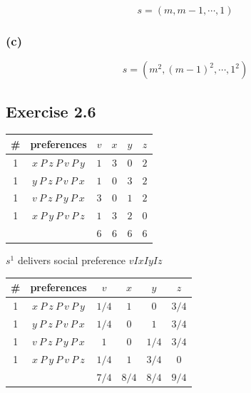 \documentclass[a4paper]{article}
\begin{document}
\[s=(m, m-1, \cdots, 1) \]

\subsubsection*{(c)}

\[s=(m^2, (m-1)^2, \cdots, 1^2) \]

\subsection*{Exercise 2.6}

\begin{table}[!htbp]
    \centering
    \begin{tabular}{c|c|cccc|}
        \# & preferences                  & $v$  & $x$  & $y$  & $z$ \\ 
        \hline
        1  & $x\: P\: z\: P\: v\: P\: y$  & $1$  & $3$  & $0$  & $2$ \\
        1  & $y\: P\: z\: P\: v\: P\: x$  & $1$  & $0$  & $3$  & $2$ \\
        1  & $v\: P\: z\: P\: y\: P\: x$  & $3$  & $0$  & $1$  & $2$ \\
        1  & $x\: P\: y\: P\: v\: P\: z$  & $1$  & $3$  & $2$  & $0$ \\
        \hline
           &                              & $6$ & $6$  & $6$  & $6$ \\
        \hline
    \end{tabular}
\end{table}

$s^1$ delivers social preference $vIxIyIz$

\begin{table}[!htbp]
    \centering
    \begin{tabular}{c|c|cccc|}
        \# & preferences                  & $v$  & $x$  & $y$  & $z$ \\ 
        \hline
        1  & $x\: P\: z\: P\: v\: P\: y$  & $1/4$  & $1$  & $0$  & $3/4$ \\
        1  & $y\: P\: z\: P\: v\: P\: x$  & $1/4$  & $0$  & $1$  & $3/4$ \\
        1  & $v\: P\: z\: P\: y\: P\: x$  & $1$  & $0$  & $1/4$  & $3/4$ \\
        1  & $x\: P\: y\: P\: v\: P\: z$  & $1/4$  & $1$  & $3/4$  & $0$ \\
        \hline
           &                              & $7/4$ & $8/4$  & $8/4$  & $9/4$ \\
        \hline
    \end{tabular}
\end{table}
\end{document}
